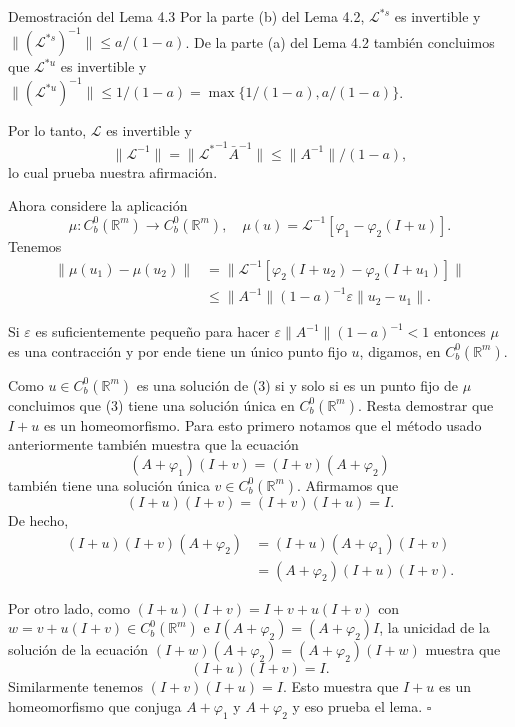 \documentclass[10pt]{beamer}
\begin{document}
\begin{frame}[allowframebreaks]{Demostración del Lema 4.3}
		Por la parte (b) del Lema 4.2, $\mathscr{L}^{*s}$ es invertible y $\|(\mathscr{L}^{*s})^{-1}\| \le a/(1 - a)$. De la parte (a) del Lema 4.2 también concluimos que $\mathscr{L}^{*u}$ es invertible y $\|(\mathscr{L}^{*u})^{-1}\| \le 1/(1 - a) = \max\{1/(1 - a), a/(1 - a)\}$. 
		
		\framebreak
		
		Por lo tanto, $\mathscr{L}$ es invertible y
		\[ \|\mathscr{L}^{-1}\| = \|{\mathscr{L}^*}^{-1}\bar{A}^{-1}\| \le \|A^{-1}\|/(1 - a), \]
		lo cual prueba nuestra afirmación.
		
		Ahora considere la aplicación
		\[ \mu: C^0_b(\mathbb{R}^m) \to C^0_b(\mathbb{R}^m), \quad \mu(u) = \mathscr{L}^{-1}[\varphi_1 - \varphi_2(I + u)]. \]
		Tenemos
		\begin{align*}
			\|\mu(u_1) - \mu(u_2)\| &= \|\mathscr{L}^{-1}[\varphi_2(I + u_2) - \varphi_2(I + u_1)]\| \\
			&\le \|A^{-1}\|(1 - a)^{-1}\varepsilon\|u_2 - u_1\|.
		\end{align*}
		
		Si $\varepsilon$ es suficientemente pequeño para hacer $\varepsilon\|A^{-1}\|(1 - a)^{-1} < 1$ entonces $\mu$ es una contracción y por ende tiene un único punto fijo $u$, digamos, en $C^0_b(\mathbb{R}^m)$. 
		
		\framebreak
		
		Como $u \in C^0_b(\mathbb{R}^m)$ es una solución de (3) si y solo si es un punto fijo de $\mu$ concluimos que (3) tiene una solución única en $C^0_b(\mathbb{R}^m)$. Resta demostrar que $I + u$ es un homeomorfismo. Para esto primero notamos que el método usado anteriormente también muestra que la ecuación
		\[ (A + \varphi_1)(I + v) = (I + v)(A + \varphi_2) \]
		también tiene una solución única $v \in C^0_b(\mathbb{R}^m)$. Afirmamos que
		\[ (I + u)(I + v) = (I + v)(I + u) = I. \]
		De hecho,
		\begin{align*}
			(I + u)(I + v)(A + \varphi_2) &= (I + u)(A + \varphi_1)(I + v) \\
			&= (A + \varphi_2)(I + u)(I + v).
		\end{align*}
		
		\framebreak
		
		Por otro lado, como $(I + u)(I + v) = I + v + u(I + v)$ con $w = v + u(I + v) \in C^0_b(\mathbb{R}^m)$ e $I(A + \varphi_2) = (A + \varphi_2)I$, la unicidad de la solución de la ecuación $(I + w)(A + \varphi_2) = (A + \varphi_2)(I + w)$ muestra que
		\[ (I + u)(I + v) = I. \]
		Similarmente tenemos $(I + v)(I + u) = I$. Esto muestra que $I + u$ es un homeomorfismo que conjuga $A + \varphi_1$ y $A + \varphi_2$ y eso prueba el lema. \hfill $\square$
	\end{frame}
	
\end{document}
